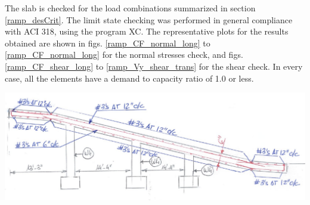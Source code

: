 The slab is checked for the load combinations summarized in section \ref{ramp_desCrit}. The limit state checking was performed in general compliance with ACI 318, using the program XC. The representative plots for the results obtained are shown in figs. \ref{ramp_CF_normal_long} to \ref{ramp_CF_normal_long} for the normal stresses check, and figs. \ref{ramp_CF_shear_long} to \ref{ramp_Vy_shear_trans} for the shear check.
In every case, all the elements have a demand to capacity ratio of 1.0 or less.
\begin{Figure}
    \includegraphics[width=\linewidth]{ramp/figures/ramp_reinf}
    \label{ramp_reinf}
\end{Figure}

